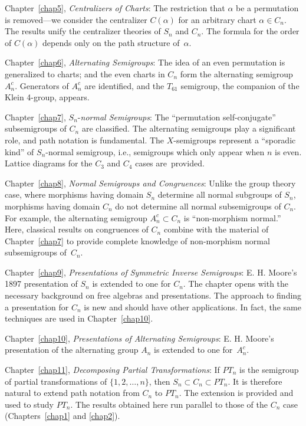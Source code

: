 \documentclass{surv-l}
\numberwithin{equation}{section}
\numberwithin{table}{section}
\numberwithin{figure}{section}
\theoremstyle{plain}
\theoremstyle{definition}
\begin{document}
Chapter~\ref{chap5}, \emph{Centralizers of Charts}: The
restriction that $\alpha$ be a permutation is removed---we
consider the centralizer $C(\alpha)$ for an arbitrary chart
$\alpha\in C_{n}$. The results unify the centralizer theories of
$S_{n}$ and $C_{n}$. The formula for the order of $C(\alpha)$
depends only on the path structure of~$\alpha$.

Chapter~\ref{chap6}, \emph{Alternating Semigroups}: The idea of an
even permutation is generalized to charts; and the even charts in
$C_{n}$ form the alternating semigroup $A_{n}^{c}$. Generators of
$A_{n}^{c}$ are identified, and the $T_{61}$ semigroup, the
companion of the Klein 4-group, appears.

Chapter~\ref{chap7}, $S_{n}$-\emph{normal Semigroups}: The
``permutation self-conjugate'' subsemigroups of $C_{n}$ are
classified. The alternating semigroups play a significant role,
and path notation is fundamental. The
$X$-semigroups represent a ``sporadic kind''
of $S_{n}$-normal semigroup, i.e., semigroups which only appear
when $n$ is even. Lattice diagrams for the $C_{3}$ and $C_{4}$
cases are~provided.

Chapter~\ref{chap8}, \emph{Normal Semigroups and Congruences}:
Unlike the group theory case, where morphisms having domain
$S_{n}$ determine all normal subgroups of $S_{n}$, morphisms
having domain $C_{n}$ do not determine all normal subsemigroups of
$C_{n}$. For example, the alternating semigroup $A_{n}^{c}\subset
C_{n}$ is ``non-morphism normal.'' Here, classical results on
congruences of $C_{n}$ combine with the material of
Chapter~\ref{chap7} to provide complete knowledge of non-morphism
normal subsemigroups of~$C_{n}$.

Chapter~\ref{chap9}, \emph{Presentations of Symmetric Inverse
Semigroups}: E. H. Moore's 1897 presentation of
$S_{n}$ is extended to one for $C_{n}$. The chapter opens with the
necessary background on free algebras and presentations. The
approach to finding a presentation for $C_{n}$ is new and should
have other applications. In fact, the same techniques are used in
Chapter~\ref{chap10}.

Chapter~\ref{chap10}, \emph{Presentations of Alternating
Semigroups}: E. H. Moore's presentation of the alternating group
$A_{n}$ is extended to one for~$A_{n}^{c}$.

Chapter~\ref{chap11}, \emph{Decomposing Partial Transformations}:
If $PT_{n}$ is the semigroup of partial transformations of $\{1,
2, \ldots,n\}$, then $S_{n}\subset C_{n}\subset PT_{n}$. It is
therefore natural to extend path notation from $C_{n}$ to
$PT_{n}$. The extension is provided and used to study $PT_{n}$.
The results obtained here run parallel to those of the $C_{n}$
case (Chapters~\ref{chap1} and \ref{chap2}).
\end{document}
